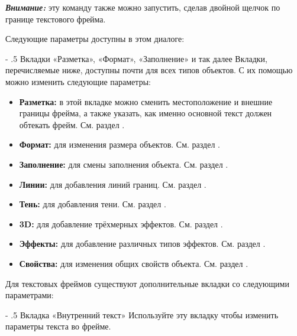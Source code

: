 ﻿\documentclass[a4paper,10pt]{article}
\makeatletter
\renewcommand\paragraph{%
   \@startsection{paragraph}{4}{0mm}%
      {-\baselineskip}%
      {.5\baselineskip}%
      {\normalfont\normalsize\bfseries}}
\makeatother
\begin{document}
\begin{mdframed}[backgroundcolor=blue!10]
\textbf{\textit{Внимание:}} эту команду также можно запустить, сделав двойной щелчок по  границе текстового фрейма.
\end{mdframed}

Следующие параметры доступны в этом диалоге:

\paragraph{Вкладки «Разметка», «Формат», «Заполнение» и так далее}
Вкладки, перечисляемые ниже, доступны почти для всех типов объектов. С их помощью можно изменить следующие параметры:

\begin{itemize}
 \item \textbf{Разметка:} в этой вкладке можно сменить местоположение и внешние границы фрейма, а также указать, как именно основной текст должен обтекать фрейм. См. раздел .
 \item \textbf{Формат:} для изменения размера объектов. См. раздел .
 \item \textbf{Заполнение:} для смены заполнения объекта. См. раздел .
 \item \textbf{Линии:} для добавления линий границ. См. раздел .
 \item \textbf{Тень:} для добавления тени. См. раздел .
 \item \textbf{3D:} для добавление трёхмерных эффектов. См. раздел .
 \item \textbf{Эффекты:} для добавление различных типов эффектов. См. раздел .
 \item \textbf{Свойства:} для изменения общих свойств объекта. См. раздел .
\end{itemize}

Для текстовых фреймов существуют дополнительные вкладки со следующими параметрами:

\paragraph{Вкладка «Внутренний текст»}
Используйте эту вкладку чтобы изменить параметры текста во фрейме.
\end{document}
